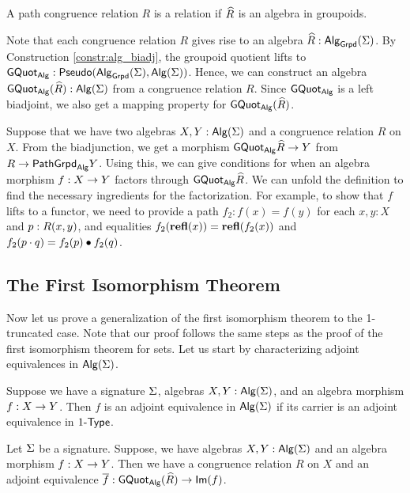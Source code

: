 \begin{definition}
A path congruence relation $R$ is a  relation if $\widehat{R}$ is an algebra in groupoids.
\end{definition}

Note that each congruence relation $R$ gives rise to an algebra $\widehat{R} : \mathsf{Alg}_{\mathsf{Grpd}}(\Sigma)$.
By Construction \ref{constr:alg_biadj}, the groupoid quotient lifts to $\mathsf{GQuot}_{\mathsf{Alg}} : \mathsf{Pseudo}(\mathsf{Alg}_{\mathsf{Grpd}}(\Sigma), \mathsf{Alg}(\Sigma))$.
Hence, we can construct an algebra $\mathsf{GQuot}_{\mathsf{Alg}}(\widehat{R}) : \mathsf{Alg}(\Sigma)$ from a congruence relation $R$.
Since $\mathsf{GQuot}_{\mathsf{Alg}}$ is a left biadjoint, we also get a mapping property for $\mathsf{GQuot}_{\mathsf{Alg}}(\widehat{R})$.

\begin{remark}
\label{remark:mapping_property_congruence}
Suppose that we have two algebras $X, Y : \mathsf{Alg}(\Sigma)$ and a congruence relation $R$ on $X$.
From the biadjunction, we get a morphism $\mathsf{GQuot}_{\mathsf{Alg}}{\widehat{R}} \rightarrow Y$ from $R \rightarrow \mathsf{PathGrpd}_{\mathsf{Alg}}{Y}$.
Using this, we can give conditions for when an algebra morphism $f : X \rightarrow Y$ factors through $\mathsf{GQuot}_{\mathsf{Alg}}{\widehat{R}}$.
We can unfold the definition to find the necessary ingredients for the factorization.
For example, to show that $f$ lifts to a functor, we need to provide a path $f_2 : f(x) = f(y)$ for each $x, y : X$ and $p : R(x, y)$, and equalities $f_2(\operatorname{\mathbf{refl}}(x)) =\operatorname{\mathbf{refl}}(f_2(x))$ and $f_2(p \cdot q) = f_2(p) \bullet f_2(q)$.
\end{remark}

\subsection{The First Isomorphism Theorem}
Now let us prove a generalization of the first isomorphism theorem to the 1-truncated case.
Note that our proof follows the same steps as the proof of the first isomorphism theorem for sets.
Let us start by characterizing adjoint equivalences in $\mathsf{Alg}(\Sigma)$.

\begin{proposition}
\label{prop:algebra_adjequiv}
Suppose we have a signature $\Sigma$, algebras $X, Y : \mathsf{Alg}(\Sigma)$, and an algebra morphism $f : X \rightarrow Y$.
Then $f$ is an adjoint equivalence in $\mathsf{Alg}(\Sigma)$ if its carrier is an adjoint equivalence in $1\mbox{-}\mathsf{Type}$.
\end{proposition}

\begin{theorem}\label{thm:iso_thm}
Let $\Sigma$ be a signature.
Suppose, we have algebras $X, Y : \mathsf{Alg}(\Sigma)$ and an algebra morphism $f : X \rightarrow Y$.
Then we have a congruence relation $R$ on $X$ and an adjoint equivalence $\overline{f} : \mathsf{GQuot}_{\mathsf{Alg}}(\widehat{R}) \rightarrow \mathsf{Im}(f)$.
\end{theorem}

